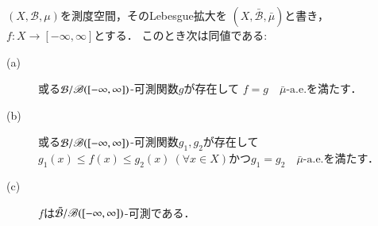 		\begin{screen}
			\begin{thm}[完備化前後の可測関数の関係]
				$(X,\mathcal{B},\mu)$を測度空間，そのLebesgue拡大を
				$(X,\bar{\mathcal{B}},\bar{\mu})$と書き，
				$f:X \longrightarrow [-\infty,\infty]$とする．
				このとき次は同値である:
				\begin{description}
					\item[(a)] 或る$\mathcal{B}/\mathscr{B}([-\infty,\infty])$-可測関数$g$が存在して
						$f = g\quad \mbox{$\bar{\mu}$-a.e.}$を満たす．
					\item[(b)] 或る$\mathcal{B}/\mathscr{B}([-\infty,\infty])$-可測関数$g_1,g_2$が存在して
						$g_1(x) \leq f(x) \leq g_2(x)\ (\forall x \in X)$かつ$g_1 = g_2\quad \mbox{$\bar{\mu}$-a.e.}$を満たす．
					\item[(c)] $f$は$\bar{\mathcal{B}}/\mathscr{B}([-\infty,\infty])$-可測である．
				\end{description}
			\end{thm}
		\end{screen}
		
